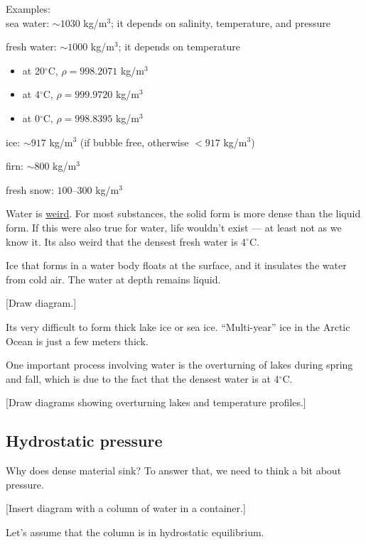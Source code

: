 Examples:\\
sea water: $\sim 1030$ kg/m$^3$; it depends on salinity, temperature, and pressure

fresh water: $\sim 1000$ kg/m$^3$; it depends on temperature\\
\begin{itemize}
\item at 20$^\circ$C, $\rho=998.2071$ kg/m$^3$
\item at 4$^\circ$C, $\rho=999.9720$ kg/m$^3$
\item at 0$^\circ$C, $\rho=998.8395$ kg/m$^3$
\end{itemize} 

ice: $\sim 917$ kg/m$^3$ (if bubble free, otherwise $<917$ kg/m$^3$)

firn: $\sim 800$ kg/m$^3$

fresh snow: $100$--$300$ kg/m$^3$

Water is \underline{weird}. For most substances, the solid form is more dense than the liquid form. If this were also true for water, life wouldn't exist --- at least not as we know it. Its also weird that the densest fresh water is 4$^\circ$C.

Ice that forms in a water body floats at the surface, and it insulates the water from cold air. The water at depth remains liquid.

[Draw diagram.]\nopagebreak
\vspace{5cm}

Its very difficult to form thick lake ice or sea ice. ``Multi-year'' ice in the Arctic Ocean is just a few meters thick.

One important process involving water is the overturning of lakes during spring and fall, which is due to the fact that the densest water is at 4$^\circ$C.

[Draw diagrams showing overturning lakes and temperature profiles.]\nopagebreak
\vspace{8cm}

\subsection{Hydrostatic pressure}
Why does dense material sink? To answer that, we need to think a bit about pressure.

[Insert diagram with a column of water in a container.]\nopagebreak
\vspace{5cm}

Let's assume that the column is in hydrostatic equilibrium.

